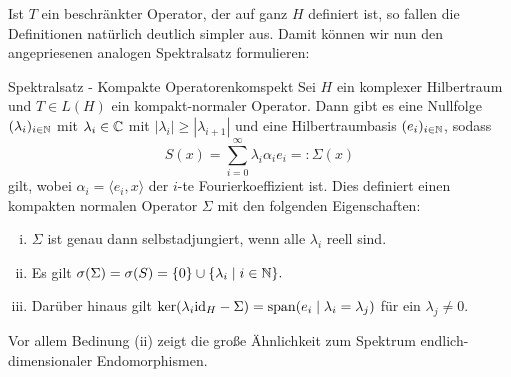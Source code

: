 Ist $T$ ein beschränkter Operator, der auf ganz $H$ definiert ist, so fallen die Definitionen natürlich deutlich simpler aus. Damit können wir nun den angepriesenen analogen Spektralsatz formulieren:

\begin{theorem}{Spektralsatz - Kompakte Operatoren}{komspekt}
Sei $H$ ein komplexer Hilbertraum und $T \in L(H)$ ein kompakt-normaler Operator. Dann gibt es eine Nullfolge $(\lambda_i)_{i \in \mathbb{N}}$ mit $\lambda_i \in \mathbb{C}$ mit $|\lambda_i| \geq |\lambda_{i+1}|$ und eine Hilbertraumbasis $(e_i)_{i \in \mathbb{N}}$, sodass
\begin{equation}
S(x) = \sum_{i=0}^\infty \lambda_i \alpha_i e_i =: \Sigma (x)
\end{equation}
gilt, wobei $\alpha_i = \langle e_i, x \rangle$ der $i$-te Fourierkoeffizient ist. Dies definiert einen kompakten normalen Operator $\Sigma$ mit den folgenden Eigenschaften:
\begin{enumerate}[(i)]
\item $\Sigma$ ist genau dann selbstadjungiert, wenn alle $\lambda_i$ reell sind.
\item Es gilt $\sigma(\Sigma)=\sigma(S)=\{0\} \cup \{\lambda_i \mid i \in \mathbb{N}\}.$
\item Darüber hinaus gilt $\ker(\lambda_i \id_H - \Sigma) = \spn(e_i \mid \lambda_i = \lambda_j)$ für ein $\lambda_j \neq 0$.
\end{enumerate}
\end{theorem}
Vor allem Bedinung (ii) zeigt die große Ähnlichkeit zum Spektrum endlich-dimensionaler Endomorphismen.

